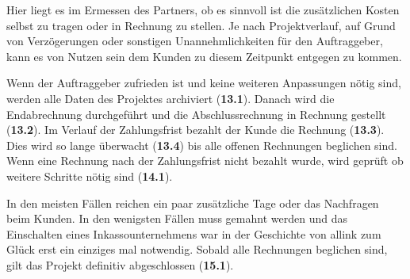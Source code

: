 Hier liegt es im Ermessen des Partners, ob es sinnvoll ist die zusätzlichen Kosten 
selbst zu tragen oder in Rechnung zu stellen. Je nach Projektverlauf, auf Grund von
Verzögerungen oder sonstigen Unannehmlichkeiten für den Auftraggeber, kann es
von Nutzen sein dem Kunden zu diesem Zeitpunkt entgegen zu kommen.

Wenn der Auftraggeber zufrieden ist und keine weiteren Anpassungen nötig sind, 
werden alle Daten des Projektes archiviert (\textbf{13.1}). Danach wird die
Endabrechnung durchgeführt und die Abschlussrechnung in Rechnung gestellt (\textbf{13.2}).
Im Verlauf der Zahlungsfrist bezahlt der Kunde die Rechnung (\textbf{13.3}).
Dies wird so lange überwacht (\textbf{13.4}) bis alle offenen Rechnungen beglichen
sind. Wenn eine Rechnung nach der Zahlungsfrist nicht bezahlt wurde, wird
geprüft ob weitere Schritte nötig sind (\textbf{14.1}).

In den meisten Fällen reichen ein paar zusätzliche Tage oder das Nachfragen beim 
Kunden. In den wenigsten Fällen muss gemahnt werden und das Einschalten eines 
Inkassounternehmens war in der Geschichte von allink zum Glück erst ein einziges 
mal notwendig. Sobald alle Rechnungen beglichen sind, gilt das Projekt definitiv 
abgeschlossen (\textbf{15.1}).
